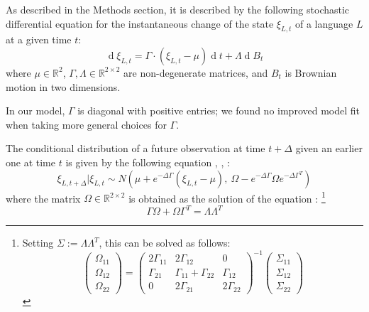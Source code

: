 \documentclass[11pt,a4paper]{article}
\begin{document}
As described in the Methods section, it is described by the following stochastic differential equation for the instantaneous change of the state $\xi_{L,t}$ of a language $L$ at a given time $t$:
\begin{equation*}
    \operatorname{d}\xi_{L,t} = \Gamma \cdot (\xi_{L,t}-\mu) \operatorname{d}t + \Lambda \operatorname{d}B_t
\end{equation*}
where $\mu \in \mathbb{R}^2$,  $\Gamma, \Lambda \in \mathbb{R}^{2\times 2}$ are non-degenerate matrices, and $B_t$ is Brownian motion in two dimensions.

In our model, $\Gamma$ is diagonal with positive entries; we found no improved model fit when taking more general choices for $\Gamma$.

The conditional distribution of a future observation at time $t+\Delta$ given an earlier one at time $t$ is given by the following equation \citep[Theorem 3.3]{schach1971weak}, \citep{gardiner1983handbook}, \citep[p. 156, eq. 6.124]{risken1989fokker}:
\begin{equation}
\xi_{L,t+\Delta} | \xi_{L,t} \sim N\left(\mu + e^{-\Delta \Gamma} (\xi_{L,t}-\mu),\ \Omega - e^{-\Delta \Gamma} \Omega e^{-\Delta \Gamma^T}\right)
\end{equation}
where the matrix $\Omega \in \mathbb{R}^{2\times 2}$ is obtained as the solution of the equation \citep[p. 110, eq. 4.4.51]{gardiner1983handbook} \citep[p. 156, eq. 6.126]{risken1989fokker}:
\footnote{Setting $\Sigma := \Lambda\Lambda^T$, this can be solved as follows:
\begin{equation}
\left(\begin{matrix} \Omega_{11} \\ \Omega_{12} \\ \Omega_{22} \end{matrix}\right)=    \left(\begin{matrix}
    2\Gamma_{11} & 2\Gamma_{12} & 0 \\
    \Gamma_{21} & \Gamma_{11}+\Gamma_{22} & \Gamma_{12} \\
    0 & 2\Gamma_{21} & 2\Gamma_{22}
    \end{matrix}\right)^{-1}  \left(\begin{matrix} \Sigma_{11} \\ \Sigma_{12} \\ \Sigma_{22} \end{matrix}\right)
\end{equation}
}
\begin{equation}
    \Gamma\Omega+\Omega\Gamma^T = \Lambda \Lambda^T
\end{equation}
\end{document}
